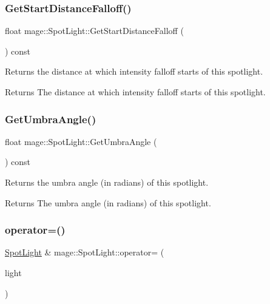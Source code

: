 \subsubsection{\texorpdfstring{Get\+Start\+Distance\+Falloff()}{GetStartDistanceFalloff()}}
{\footnotesize\ttfamily float mage\+::\+Spot\+Light\+::\+Get\+Start\+Distance\+Falloff (\begin{DoxyParamCaption}{ }\end{DoxyParamCaption}) const\hspace{0.3cm}{\ttfamily [noexcept]}}

Returns the distance at which intensity falloff starts of this spotlight.

\begin{DoxyReturn}{Returns}
The distance at which intensity falloff starts of this spotlight. 
\end{DoxyReturn}
\hypertarget{classmage_1_1_spot_light_a61d921afd94fbbf040cdb697d89c1a94}{}\label{classmage_1_1_spot_light_a61d921afd94fbbf040cdb697d89c1a94} 
\subsubsection{\texorpdfstring{Get\+Umbra\+Angle()}{GetUmbraAngle()}}
{\footnotesize\ttfamily float mage\+::\+Spot\+Light\+::\+Get\+Umbra\+Angle (\begin{DoxyParamCaption}{ }\end{DoxyParamCaption}) const\hspace{0.3cm}{\ttfamily [noexcept]}}

Returns the umbra angle (in radians) of this spotlight.

\begin{DoxyReturn}{Returns}
The umbra angle (in radians) of this spotlight. 
\end{DoxyReturn}
\hypertarget{classmage_1_1_spot_light_a04a23d643186a58fb3a03d0a73a63e39}{}\label{classmage_1_1_spot_light_a04a23d643186a58fb3a03d0a73a63e39} 
\subsubsection{\texorpdfstring{operator=()}{operator=()}\hspace{0.1cm}{\footnotesize\ttfamily [1/2]}}
{\footnotesize\ttfamily \hyperlink{classmage_1_1_spot_light}{Spot\+Light} \& mage\+::\+Spot\+Light\+::operator= (\begin{DoxyParamCaption}\item[{const \hyperlink{classmage_1_1_spot_light}{Spot\+Light} \&}]{light }\end{DoxyParamCaption})\hspace{0.3cm}{\ttfamily [default]}}

